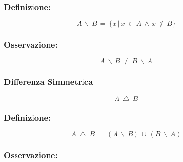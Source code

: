 \documentclass{article}
\begin{document}
        \subsubsection*{Definizione:}
        
        \begin{LARGE}
            \begin{equation*}
                A\ \backslash\ B\ =\ \{x\ |\ x\ \in\ A\ \wedge\ x\ \notin\ B\}
            \end{equation*}
        \end{LARGE}

        \subsubsection*{Osservazione:}

        \begin{Large}
            \begin{equation*}
                A\ \backslash\ B\ \ne\ B\ \backslash\ A
            \end{equation*}
        \end{Large}

        \subsubsection{Differenza Simmetrica}
        \begin{LARGE}
            \begin{equation*}
                A\ \bigtriangleup\ B
            \end{equation*}
        \end{LARGE}
        
        \subsubsection*{Definizione:}
        
        \begin{LARGE}
            \begin{equation*}
                A\ \bigtriangleup\ B\ =\ (A\ \backslash\ B)\ \cup\ (B\ \backslash\ A)
            \end{equation*}
        \end{LARGE}

        \subsubsection*{Osservazione:}
\end{document}
